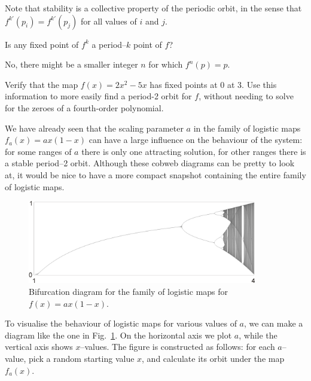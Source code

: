 Note that stability is a collective property of the periodic orbit, in the sense that $f^{k'}(p_i) = f^{k'}(p_j)$ for all values of $i$ and $j$.

\begin{exer}
Is any fixed point of $f^k$ a period--$k$ point of $f$?
\begin{sol}
No, there might be a smaller integer $n$ for which $f^n(p)=p$.  
\end{sol}
\end{exer}

\begin{exer}
Verify that the map $f(x)=2x^2-5x$ has fixed points at 0 at 3. Use this information to more easily find a period-2 orbit for $f$, without needing to solve for the zeroes of a fourth-order polynomial.
\end{exer}


\pagebreak


We have already seen that the scaling parameter $a$ in the family of logistic maps $f_a(x)=ax(1-x)$ can have a large influence on the behaviour of the system: for some ranges of $a$ there is only one attracting solution, for other ranges there is a stable period--2 orbit. Although these cobweb diagrams can be pretty to look at, it would be nice to have a more compact snapshot containing the entire family of logistic maps.

\begin{figure}[H]
\centering
\includegraphics[width=10cm]{dynamic/figures/bifurcation}
\caption{Bifurcation diagram for the family of logistic maps for $f(x)=ax(1-x)$.}
\label{fig-bifur}
\end{figure} 

To visualise the behaviour of logistic maps for various values of $a$, we can make a diagram like the one in Fig.~\ref{fig-bifur}. On the horizontal axis we plot $a$, while the vertical axis shows $x$--values. The figure is constructed as follows: for each $a$--value, pick a random starting value $x$, and calculate its orbit under the map $f_a(x)$.

